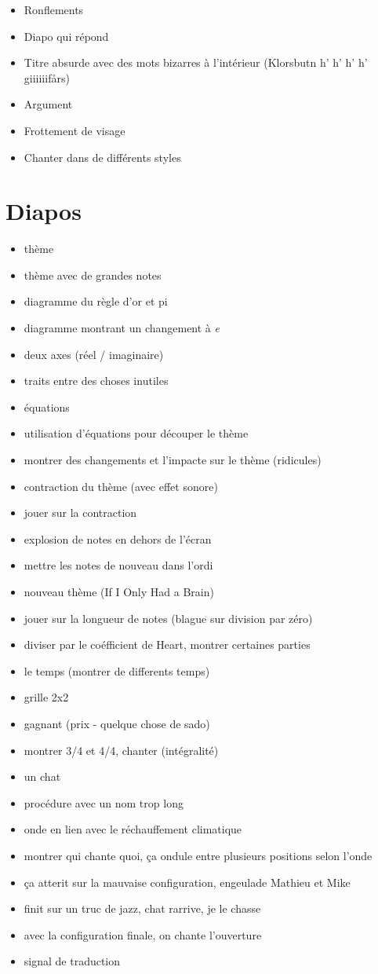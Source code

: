 \documentclass{article}
\begin{document}
\begin{itemize}
\item Ronflements
\item Diapo qui répond
\item Titre absurde avec des mots bizarres à l'intérieur (Klorsbutn h' h' h'
h' giiiiiifårs)
\item Argument
\item Frottement de visage
\item Chanter dans de différents styles
\end{itemize}
\section{Diapos}
\begin{itemize}
\item thème
\item thème avec de grandes notes
\item diagramme du règle d'or et pi
\item diagramme montrant un changement à \emph{e}
\item deux axes (réel / imaginaire)
\item traits entre des choses inutiles
\item équations
\item utilisation d'équations pour découper le thème
\item montrer des changements et l'impacte sur le thème (ridicules)
\item contraction du thème (avec effet sonore)
\item jouer sur la contraction
\item explosion de notes en dehors de l'écran
\item mettre les notes de nouveau dans l'ordi
\item nouveau thème (If I Only Had a Brain)
\item jouer sur la longueur de notes (blague sur division par zéro)
\item diviser par le coéfficient de Heart, montrer certaines parties
\item le temps (montrer de differents temps)
\item grille 2x2
\item gagnant (prix - quelque chose de sado)
\item montrer 3/4 et 4/4, chanter (intégralité)
\item un chat
\item procédure avec un nom trop long
\item onde en lien avec le réchauffement climatique
\item montrer qui chante quoi, ça ondule entre plusieurs positions selon l'onde
\item ça atterit sur la mauvaise configuration, engeulade Mathieu et Mike
\item finit sur un truc de jazz, chat rarrive, je le chasse
\item avec la configuration finale, on chante l'ouverture
\item signal de traduction
\end{itemize}
\end{document}
